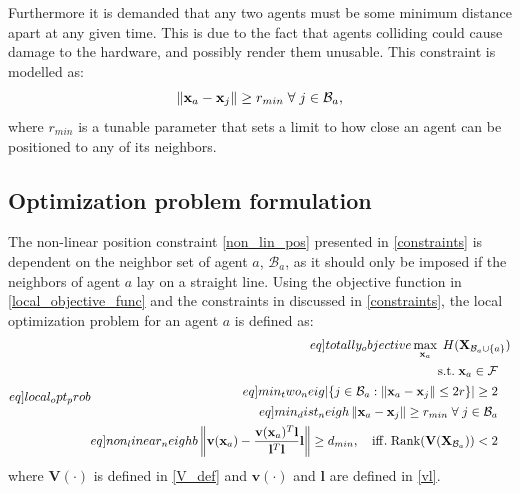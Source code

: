 Furthermore it is demanded that any two agents must be some minimum distance apart at any given time. This is due to the fact that agents colliding could cause damage to the hardware, and possibly render them unusable.
This constraint is modelled as:
\begin{equation}
  \left\lVert\mathbf{x}_{a} - \mathbf{x}_{j}\right\rVert \geq r_{min} \;\forall\;j\in\mathcal{B}_{a},
\end{equation}
where $r_{min}$ is a tunable parameter that sets a limit to how close an agent can be positioned to any of its neighbors.\clearpage
\subsection{Optimization problem formulation}
The non-linear position constraint \eqref{non_lin_pos} presented in \ref{constraints} is dependent on the neighbor set of agent $a$, $\mathcal{B}_{a}$, as it should only be imposed if the 
neighbors of agent $a$ lay on a straight line. Using the objective function in \eqref{local_objective_func} and the constraints in discussed in \ref{constraints}, the local optimization problem for an agent $a$ is defined as:
\begin{subequations}\label[eq]{local_opt_prob}
  \begin{align}
    \begin{split}\label[eq]{totally_objective}
      &\max_{\mathbf{x}_{a}}\;H(\mathbf{X}_{\mathcal{B}_{a}\cup\{a\}})\\
    \end{split}\\
    \mathrm{s.t.}\;
    \begin{split}
      &\mathbf{x}_{a}\in\mathcal{F}
    \end{split}\\
    \begin{split}\label[eq]{min_two_neig}
      &|\{j\in\mathcal{B}_{a}: \norm{\mathbf{x}_{a} - \mathbf{x}_{j}} \leq 2r\}|\geq 2
    \end{split}\\
    \begin{split}\label[eq]{min_dist_neigh}
      &\norm{\mathbf{x}_{a} - \mathbf{x}_{j}} \geq r_{min}\;\forall\;j\in\mathcal{B}_{a}
    \end{split}\\
    \begin{split}\label[eq]{non_linear_neighb}
      &\norm{\mathbf{v}(\mathbf{x}_{a}) - \frac{\mathbf{v}(\mathbf{x}_{a})^{T}\mathbf{l}}{\mathbf{l}^{T}\mathbf{l}}\mathbf{l}}\geq d_{min},\quad\mathrm{iff.}\;\mathrm{Rank}(\mathbf{V}(\mathbf{X}_{\mathcal{B}_{a}}))<2
    \end{split}
\end{align}
\end{subequations}
where $\mathbf{V}(\cdot)$ is defined in \eqref{V_def} and $\mathbf{v}(\cdot)$ and $\mathbf{l}$ are defined in \eqref{vl}.

